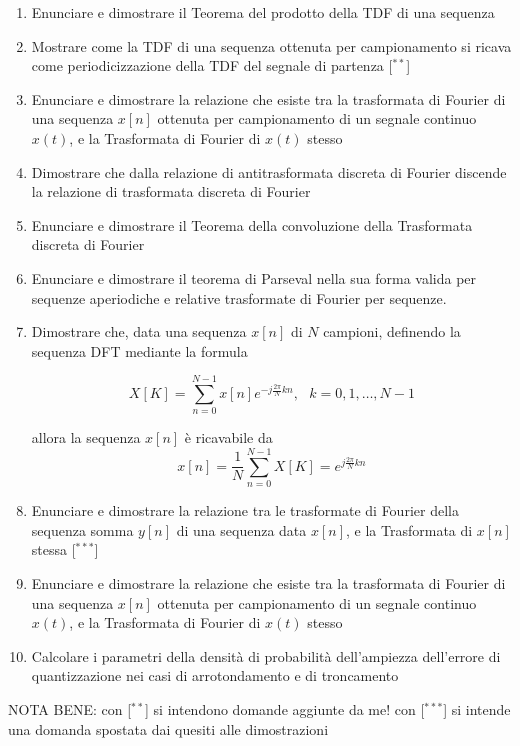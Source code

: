 \documentclass[
]{article}
\begin{document}
\begin{enumerate}
\def\labelenumi{\arabic{enumi}.}
\item
  Enunciare e dimostrare il Teorema del prodotto della TDF di una
  sequenza
\item
  Mostrare come la TDF di una sequenza ottenuta per campionamento si
  ricava come periodicizzazione della TDF del segnale di partenza
  {[}\(^{**}\){]}
\item
  Enunciare e dimostrare la relazione che esiste tra la trasformata di
  Fourier di una sequenza \(x[n]\) ottenuta per campionamento di un
  segnale continuo \(x(t)\), e la Trasformata di Fourier di \(x(t)\)
  stesso
\item
  Dimostrare che dalla relazione di antitrasformata discreta di Fourier
  discende la relazione di trasformata discreta di Fourier
\item
  Enunciare e dimostrare il Teorema della convoluzione della Trasformata
  discreta di Fourier
\item
  Enunciare e dimostrare il teorema di Parseval nella sua forma valida
  per sequenze aperiodiche e relative trasformate di Fourier per
  sequenze.
\item
  Dimostrare che, data una sequenza \(x[n]\) di \(N\) campioni,
  definendo la sequenza DFT mediante la formula

  \[
  \displaystyle
  X[K] = \sum_{n=0}^{N-1} x[n] e^{-j \frac{2\pi}{N} kn}, \ \ \ k = 0, 1 , \dots, N-1
  \]

  allora la sequenza \(x[n]\) è ricavabile da \[
  \displaystyle
  x[n] = \frac{1}{N} \sum_{n=0}^{N-1} X[K] = e^{j \frac{2\pi}{N} kn}
   \]
\item
  Enunciare e dimostrare la relazione tra le trasformate di Fourier
  della sequenza somma \(y[n]\) di una sequenza data \(x[n]\), e la
  Trasformata di \(x[n]\) stessa {[}\(^{***}\){]}
\item
  Enunciare e dimostrare la relazione che esiste tra la trasformata di
  Fourier di una sequenza \(x[n]\) ottenuta per campionamento di un
  segnale continuo \(x(t)\), e la Trasformata di Fourier di \(x(t)\)
  stesso
\item
  Calcolare i parametri della densità di probabilità dell'ampiezza
  dell'errore di quantizzazione nei casi di arrotondamento e di
  troncamento
\end{enumerate}

NOTA BENE: con {[}\(^{**}\){]} si intendono domande aggiunte da me! con
{[}\(^{***}\){]} si intende una domanda spostata dai quesiti alle
dimostrazioni
\end{document}
